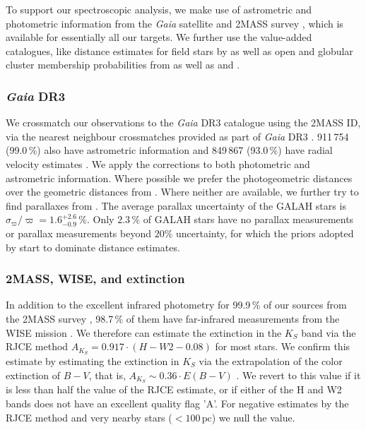\documentclass[
  journal=pasa,
  manuscript=research-paper, %
  year=2024,
  volume=37
]{cup-journal}
\newcommand{\Gaia}{\textit{Gaia}\xspace}
\begin{document}
To support our spectroscopic analysis, we make use of astrometric and photometric information from the \Gaia satellite \citep{Gaia-Collaboration2016} and 2MASS survey \citep{Skrutskie2006}, which is available for essentially all our targets. We further use the value-added catalogues, like distance estimates for field stars by \citep{BailerJones2021} as well as open and globular cluster membership probabilities from \citet{CantatGaudin2020} as well as \citet{Vasiliev2021} and \citet{Baumgardt2021}.

\subsubsection{\Gaia DR3}

We crossmatch our observations to the \Gaia DR3 catalogue \citep{Brown2021,GaiaDR3} using the 2MASS ID, via the nearest neighbour crossmatches provided as part of \Gaia DR3 \citep{Torra2021}. 
911\,754 (99.0\,\%) also have astrometric information \citep{Lindegren2021a} and 849\,867 (93.0\,\%) have radial velocity estimates \citep{Katz2022}. We apply the corrections to both photometric \citep{Riello2021} and astrometric \citep{Lindegren2021b}information. Where possible we prefer the photogeometric distances over the geometric distances from \citep{BailerJones2021}. Where neither are available, we further try to find parallaxes from \cite{vanLeeuwen2007}. The average parallax uncertainty of the GALAH stars is $\sigma_{\varpi} / \varpi = 1.6_{-0.9}^{+2.6}\,\mathrm{\%}$. Only $2.3\,\%$ of GALAH stars have no parallax measurements or parallax measurements beyond $20\%$ uncertainty, for which the priors adopted by \citep{BailerJones2021} start to dominate distance estimates.

\subsubsection{2MASS, WISE, and extinction}

In addition to the excellent infrared photometry for 99.9\,\% of our sources from the 2MASS survey \citep{Skrutskie2006}, 98.7\,\% of them have far-infrared measurements from the WISE mission \citep{Cutri2013}. We therefore can estimate the extinction in the $K_S$ band via the RJCE method \citep{Majewski2011} $A_{K_S}  = 0.917 \cdot \left( H - W2 - 0.08 \right)$ for most stars. We confirm this estimate by estimating the extinction in $K_S$ via the extrapolation of the color extinction of $B-V$, that is, $A_{K_S} \sim 0.36 \cdot E(B-V)$ \citep{Cardelli1989}. We revert to this value if it is less than half the value of the RJCE estimate, or if either of the H and W2 bands does not have an excellent quality flag 'A'. For negative estimates by the RJCE method and very nearby stars ($<100\,\mathrm{pc}$) we null the value.
\end{document}
